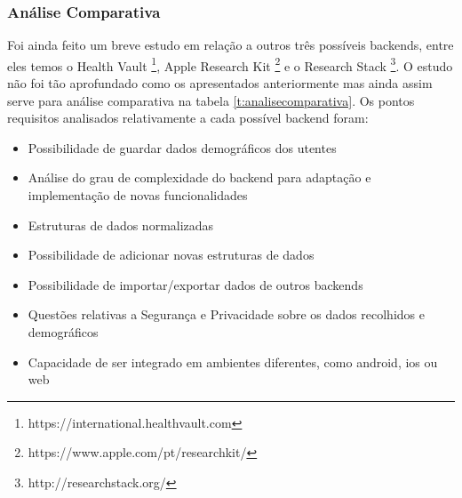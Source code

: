 \subsubsection{Análise Comparativa}

Foi ainda feito um breve estudo em relação a outros três possíveis backends, entre eles temos o Health Vault \footnote{https://international.healthvault.com}, Apple Research Kit \footnote{https://www.apple.com/pt/researchkit/} e o Research Stack \footnote{http://researchstack.org/}. O estudo não foi tão aprofundado como os apresentados anteriormente mas ainda assim serve para análise comparativa na tabela \ref{t:analisecomparativa}. Os pontos requisitos analisados relativamente a cada possível backend foram: 
\begin{itemize}
  \item Possibilidade de guardar dados demográficos dos utentes
  \item Análise do grau de complexidade  do backend para adaptação e implementação de novas funcionalidades
  \item Estruturas de dados normalizadas
  \item Possibilidade de adicionar novas estruturas de dados 
  \item Possibilidade de importar/exportar dados de outros backends
  \item Questões relativas a Segurança e Privacidade sobre os dados recolhidos e demográficos
  \item Capacidade de ser integrado em ambientes diferentes, como android, ios ou web
\end{itemize}

